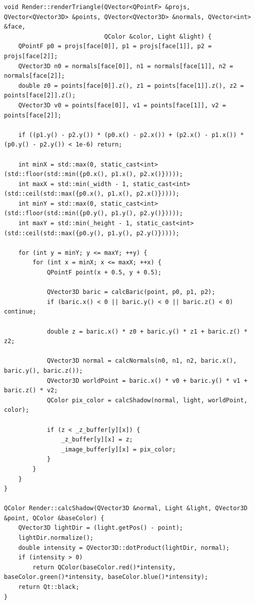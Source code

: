 \documentclass[a4paper, 14pt]{extreport}
\begin{document}
\begin{lstlisting}[style=lang, label=lst:z,caption=Реализация алгоритма с использованием Z-буфера]
void Render::renderTriangle(QVector<QPointF> &projs, QVector<QVector3D> &points, QVector<QVector3D> &normals, QVector<int> &face,
                            QColor &color, Light &light) {
    QPointF p0 = projs[face[0]], p1 = projs[face[1]], p2 = projs[face[2]];
    QVector3D n0 = normals[face[0]], n1 = normals[face[1]], n2 = normals[face[2]];
    double z0 = points[face[0]].z(), z1 = points[face[1]].z(), z2 = points[face[2]].z();
    QVector3D v0 = points[face[0]], v1 = points[face[1]], v2 = points[face[2]];

    if ((p1.y() - p2.y()) * (p0.x() - p2.x()) + (p2.x() - p1.x()) * (p0.y() - p2.y()) < 1e-6) return;

    int minX = std::max(0, static_cast<int>(std::floor(std::min({p0.x(), p1.x(), p2.x()}))));
    int maxX = std::min(_width - 1, static_cast<int>(std::ceil(std::max({p0.x(), p1.x(), p2.x()}))));
    int minY = std::max(0, static_cast<int>(std::floor(std::min({p0.y(), p1.y(), p2.y()}))));
    int maxY = std::min(_height - 1, static_cast<int>(std::ceil(std::max({p0.y(), p1.y(), p2.y()}))));

    for (int y = minY; y <= maxY; ++y) {
        for (int x = minX; x <= maxX; ++x) {
            QPointF point(x + 0.5, y + 0.5);

            QVector3D baric = calcBaric(point, p0, p1, p2);
            if (baric.x() < 0 || baric.y() < 0 || baric.z() < 0) continue;

            double z = baric.x() * z0 + baric.y() * z1 + baric.z() * z2;

            QVector3D normal = calcNormals(n0, n1, n2, baric.x(), baric.y(), baric.z());
            QVector3D worldPoint = baric.x() * v0 + baric.y() * v1 + baric.z() * v2;
            QColor pix_color = calcShadow(normal, light, worldPoint, color);

            if (z < _z_buffer[y][x]) {
                _z_buffer[y][x] = z;
                _image_buffer[y][x] = pix_color;
            }
        }
    }
}

QColor Render::calcShadow(QVector3D &normal, Light &light, QVector3D &point, QColor &baseColor) {
    QVector3D lightDir = (light.getPos() - point);
    lightDir.normalize();
    double intensity = QVector3D::dotProduct(lightDir, normal);
    if (intensity > 0)
        return QColor(baseColor.red()*intensity, baseColor.green()*intensity, baseColor.blue()*intensity);
    return Qt::black;
}


\end{lstlisting}
\end{document}
